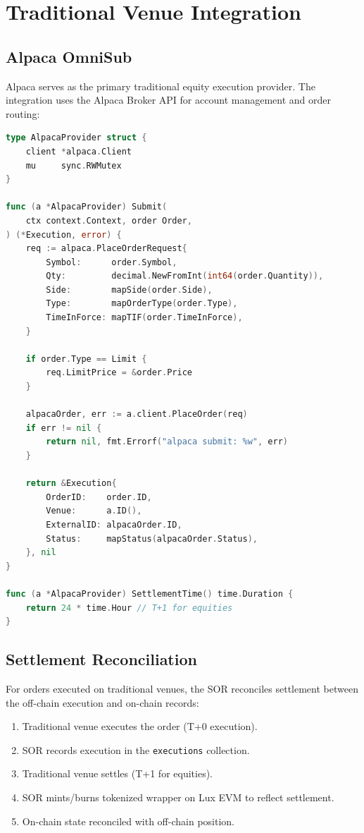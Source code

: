 \documentclass[11pt,a4paper]{article}
\begin{document}
\section{Traditional Venue Integration}\label{sec:traditional}

\subsection{Alpaca OmniSub}

Alpaca serves as the primary traditional equity execution provider. The integration uses the Alpaca Broker API for account management and order routing:

\begin{lstlisting}[language=Go,caption={Alpaca provider implementation.}]
type AlpacaProvider struct {
    client *alpaca.Client
    mu     sync.RWMutex
}

func (a *AlpacaProvider) Submit(
    ctx context.Context, order Order,
) (*Execution, error) {
    req := alpaca.PlaceOrderRequest{
        Symbol:      order.Symbol,
        Qty:         decimal.NewFromInt(int64(order.Quantity)),
        Side:        mapSide(order.Side),
        Type:        mapOrderType(order.Type),
        TimeInForce: mapTIF(order.TimeInForce),
    }

    if order.Type == Limit {
        req.LimitPrice = &order.Price
    }

    alpacaOrder, err := a.client.PlaceOrder(req)
    if err != nil {
        return nil, fmt.Errorf("alpaca submit: %w", err)
    }

    return &Execution{
        OrderID:    order.ID,
        Venue:      a.ID(),
        ExternalID: alpacaOrder.ID,
        Status:     mapStatus(alpacaOrder.Status),
    }, nil
}

func (a *AlpacaProvider) SettlementTime() time.Duration {
    return 24 * time.Hour // T+1 for equities
}
\end{lstlisting}

\subsection{Settlement Reconciliation}

For orders executed on traditional venues, the SOR reconciles settlement between the off-chain execution and on-chain records:

\begin{enumerate}[nosep]
  \item Traditional venue executes the order (T+0 execution).
  \item SOR records execution in the \texttt{executions} collection.
  \item Traditional venue settles (T+1 for equities).
  \item SOR mints/burns tokenized wrapper on Lux EVM to reflect settlement.
  \item On-chain state reconciled with off-chain position.
\end{enumerate}
\end{document}
